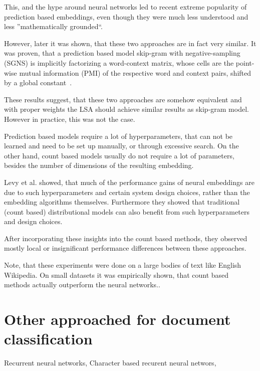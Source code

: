     This, and the hype around neural networks led to recent extreme popularity of prediction based embeddings,
    even though they were much less understood and less ''mathematically grounded``.
    
    However, later it was shown, that these two approaches are in fact very similar.
    It was proven, that a prediction based model skip-gram with negative-sampling (SGNS) 
    is implicitly factorizing a word-context matrix,
    whose cells are the point-wise mutual information (PMI) of the respective word and context pairs, 
    shifted by a global constant~\cite{levy2014neural}. %
    
    These results suggest, that these two approaches are somehow equivalent and with proper weights the LSA should achieve similar results as skip-gram model. 
    However in practice, this was not the case.
    
    Prediction based models require a lot of hyperparameters, that can not be learned and need to be set up manually,
    or through excessive search.
    On the other hand, count based models usually do not require a lot of parameters, besides the number of dimensions of the resulting embedding. 
    
    Levy et al. \cite{levy2015improving} %
    showed, that much  of  the  performance  gains  of  neural embeddings  are  due  to such hyperparameters and certain system design choices, rather than the embedding algorithms themselves. 
    Furthermore they showed that traditional (count based) distributional models
    can also benefit from such hyperparameters and design choices.
    
    After incorporating these insights into the count based methods, 
    they observed mostly local or insignificant performance differences between these approaches.
    
    Note, that these experiments were done on a large bodies of text like English Wikipedia.   
    On small datasets it was empirically shown, that count based methods actually outperform the neural networks.\cite{altszyler2016comparative}. %
    
    
\section{Other approached for document classification}
    
    Recurrent neural networks,
    Character based recurent neural networs, 

\* %